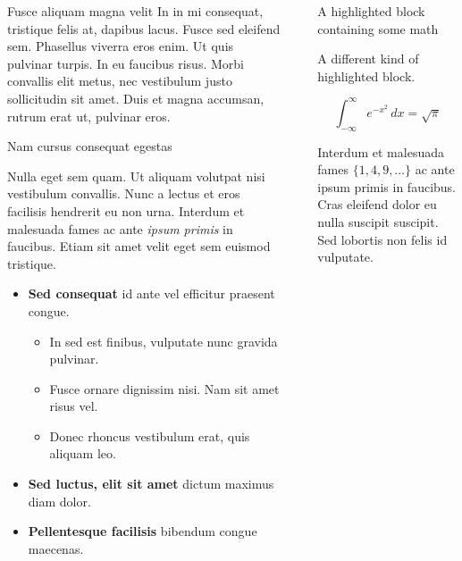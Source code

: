 \documentclass[final]{beamer}
\newlength{\sepwidth}
\newlength{\colwidth}
\newcommand{\separatorcolumn}{\begin{column}{\sepwidth}\end{column}}
\begin{document}
\begin{frame}[t]
\begin{columns}[t]
\begin{column}{\colwidth}
\begin{block}{Fusce aliquam magna velit}
    In in mi consequat, tristique felis at, dapibus lacus. Fusce sed eleifend
    sem. Phasellus viverra eros enim. Ut quis pulvinar turpis. In eu faucibus
    risus. Morbi convallis elit metus, nec vestibulum justo sollicitudin sit
    amet. Duis et magna accumsan, rutrum erat ut, pulvinar eros.

  \end{block}

  \begin{block}{Nam cursus consequat egestas}

    Nulla eget sem quam. Ut aliquam volutpat nisi vestibulum convallis. Nunc a
    lectus et eros facilisis hendrerit eu non urna. Interdum et malesuada fames
    ac ante \textit{ipsum primis} in faucibus. Etiam sit amet velit eget sem
    euismod tristique.

    \begin{itemize}
      \item \textbf{Sed consequat} id ante vel efficitur praesent congue.
        \begin{itemize}
          \item In sed est finibus, vulputate nunc gravida pulvinar.
          \item Fusce ornare dignissim nisi. Nam sit amet risus vel.
          \item Donec rhoncus vestibulum erat, quis aliquam leo.
        \end{itemize}
      \item \textbf{Sed luctus, elit sit amet} dictum maximus diam dolor.
      \item \textbf{Pellentesque facilisis} bibendum congue maecenas.
    \end{itemize}

  \end{block}

\end{column}

\separatorcolumn

\begin{column}{\colwidth}

  \begin{blueblock}{A highlighted block containing some math}

    A different kind of highlighted block.

    $$
    \int_{-\infty}^{\infty} e^{-x^2}\,dx = \sqrt{\pi}
    $$

    Interdum et malesuada fames $\{1, 4, 9, \ldots\}$ ac ante ipsum primis in
    faucibus. Cras eleifend dolor eu nulla suscipit suscipit. Sed lobortis non
    felis id vulputate.


\end{blueblock}
\end{column}
\end{columns}
\end{frame}
\end{document}
